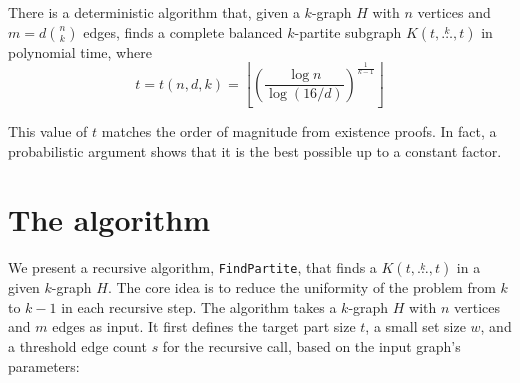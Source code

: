 \documentclass[12pt]{article}
\newcommand{\compoverset}[2]{\ensuremath{K(#2, \overset{#1}{\dots}, #2)}}
\begin{document}
\begin{theorem} \label{thm:main_theorem}
There is a deterministic algorithm that, given a $k$-graph $H$ with $n$ vertices and $m=d \binom{n}{k}$ edges, finds a complete balanced $k$-partite subgraph $\compoverset{k}{t}$ in polynomial time, where
\[
    t = t(n, d, k) = \left\lfloor \left( \frac{\log n}{\log (16/d)}  \right)^{\frac{1}{k-1}} \right \rfloor
\]
\end{theorem}
This value of $t$ matches the order of magnitude from existence proofs.
In fact, a probabilistic argument shows that it is the best possible up to a constant factor.

\section{The algorithm}\label{sec:finding-a-balanced-$k$-partite-subgraph}

We present a recursive algorithm, \texttt{FindPartite}, that finds a $\compoverset{k}{t}$ in a given $k$-graph $H$.
The core idea is to reduce the uniformity of the problem from $k$ to $k-1$ in each recursive step.
The algorithm takes a $k$-graph $H$ with $n$ vertices and $m$ edges as input.
It first defines the target part size $t$, a small set size $w$,
and a threshold edge count $s$ for the recursive call, based on the input graph's parameters:
\end{document}
